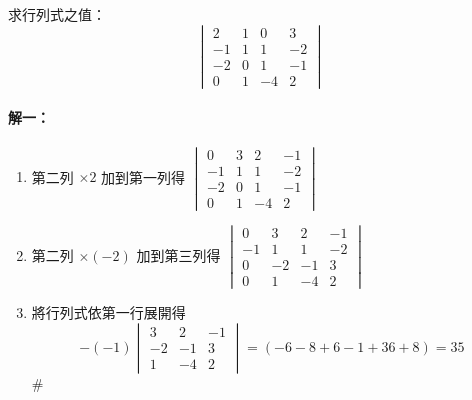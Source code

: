 \begin{example}\label{ex:b6s-1-29}
求行列式之值：
\[ \begin{vmatrix}
2 & 1 & 0 & 3 \\
-1 & 1 & 1 & -2 \\
-2 & 0 & 1 & -1 \\
0 & 1 & -4 & 2
\end{vmatrix} \]
\end{example}

\paragraph{解一：}
\begin{enumerate}[label=(\roman*)]
  \item 第二列 $\times 2$ 加到第一列得 $\begin{vmatrix} 0 & 3 & 2 & -1 \\ -1 & 1 & 1 & -2 \\ -2 & 0 & 1 & -1 \\ 0 & 1 & -4 & 2 \end{vmatrix}$
  \item 第二列 $\times (-2)$ 加到第三列得 $\begin{vmatrix} 0 & 3 & 2 & -1 \\ -1 & 1 & 1 & -2 \\ 0 & -2 & -1 & 3 \\ 0 & 1 & -4 & 2 \end{vmatrix}$
  \item 將行列式依第一行展開得
  \[ -(-1) \begin{vmatrix} 3 & 2 & -1 \\ -2 & -1 & 3 \\ 1 & -4 & 2 \end{vmatrix} = (-6-8+6-1+36+8) = 35 \]\hfill$\#$
\end{enumerate}

